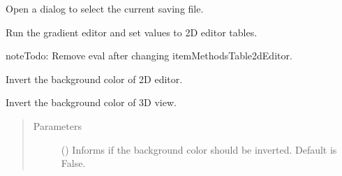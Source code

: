 \documentclass[a4paper,10pt,english]{sphinxmanual}
\begin{document}
\begin{fulllineitems}
\begin{fulllineitems}
\label{\detokenize{autodoc/mrsprint/mrsprint:mrsprint.mainwindow.MainWindow.fileSaveAs}}
Open a dialog to select the current saving file.

\end{fulllineitems}


\begin{fulllineitems}
\label{\detokenize{autodoc/mrsprint/mrsprint:mrsprint.mainwindow.MainWindow.gradient2DEditor}}
Run the gradient editor and set values to 2D editor tables.

\begin{sphinxadmonition}{note}{\label{autodoc/mrsprint/mrsprint:index-1}Todo:}
Remove eval after changing itemMethodsTable2dEditor.
\end{sphinxadmonition}

\end{fulllineitems}


\begin{fulllineitems}
\label{\detokenize{autodoc/mrsprint/mrsprint:mrsprint.mainwindow.MainWindow.invertBackground2DEditor}}
Invert the background color of 2D editor.

\end{fulllineitems}


\begin{fulllineitems}
\label{\detokenize{autodoc/mrsprint/mrsprint:mrsprint.mainwindow.MainWindow.invertBackground3DView}}
Invert the background color of 3D view.
\begin{quote}\begin{description}
\item[{Parameters}] \leavevmode
{} () \textendash{} Informs if the background color should be inverted. Default is False.


\end{description}
\end{quote}
\end{fulllineitems}
\end{fulllineitems}
\end{document}
